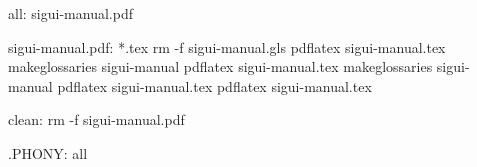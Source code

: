 all: sigui-manual.pdf

sigui-manual.pdf: *.tex
	rm -f sigui-manual.gls
	pdflatex sigui-manual.tex
	makeglossaries sigui-manual
	pdflatex sigui-manual.tex
	makeglossaries sigui-manual
	pdflatex sigui-manual.tex
	pdflatex sigui-manual.tex

clean:
	rm -f sigui-manual.pdf


.PHONY: all
